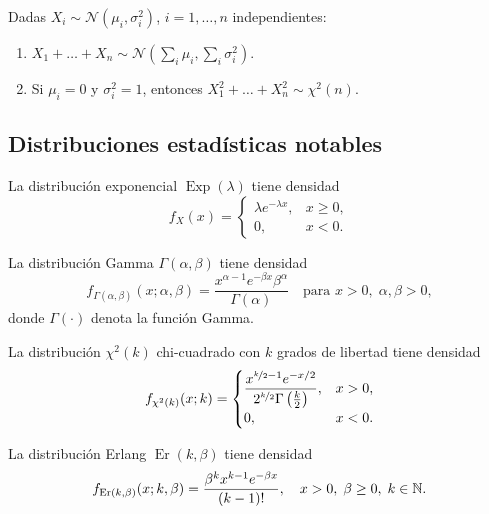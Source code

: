 \textcolor{azulresalt}{
\begin{proposicion}
Dadas $X_i \sim \mathcal{N}(\mu_i, \sigma_i^2)$, $i=1,\dots,n$ independientes:
\begin{enumerate}
  \item $X_1 + \dots + X_n \sim \mathcal{N}\!\left(\sum_i \mu_i, \sum_i \sigma_i^2\right)$.
  \item Si $\mu_i = 0$ y $\sigma_i^2 = 1$, entonces $X_1^2 + \dots + X_n^2 \sim \chi^2(n)$.
\end{enumerate}
\end{proposicion}
}
\subsection{Distribuciones estadísticas notables}

\textcolor{azulresalt}{
\begin{definicion}[28]
La distribución exponencial $\operatorname{Exp}(\lambda)$ tiene densidad
\[
  f_X(x) =
  \begin{cases}
    \lambda e^{-\lambda x}, & x \ge 0, \\
    0, & x < 0.
  \end{cases}
\]
\end{definicion}
}

\textcolor{azulresalt}{
\begin{definicion}[29]
La distribución Gamma $\Gamma(\alpha, \beta)$ tiene densidad
\[
  f_{\Gamma(\alpha,\beta)}(x; \alpha, \beta) = \frac{x^{\alpha-1} e^{-\beta x} \beta^\alpha}{\Gamma(\alpha)} \quad \text{para } x > 0, \; \alpha, \beta > 0,
\]
donde $\Gamma(\cdot)$ denota la función Gamma.
\end{definicion}
}

\textcolor{azulresalt}{
\begin{definicion}[30]
La distribución $\chi^2(k)$ chi-cuadrado con $k$ grados de libertad tiene densidad
\[
  f_{\chi^2(k)}(x; k) =
  \begin{cases}
    \dfrac{x^{\nicefrac{k}{2} - 1} e^{-x/2}}{2^{\nicefrac{k}{2}}\Gamma\left(\frac{k}{2}\right)}, & x > 0, \\[6pt]
    0, & x < 0.
  \end{cases}
\]
\end{definicion}}

\textcolor{azulresalt}{
\begin{definicion}[31]
La distribución Erlang $\operatorname{Er}(k, \beta)$ tiene densidad
\[
  f_{\operatorname{Er}(k,\beta)}(x; k, \beta) = \frac{\beta^k x^{k-1} e^{-\beta x}}{(k-1)!}, \quad x > 0, \; \beta \ge 0, \; k \in \mathbb{N}.
\]
\end{definicion}}

